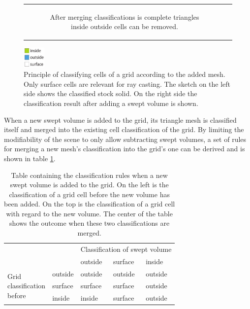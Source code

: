 \begin{figure}[!h]
\begin{tabular}{cc}
\begin{subfigure}[t]{0.3\textwidth}
			\caption{After merging classifications is complete triangles inside outside cells can be removed.}
			\label{fig:classification_after_removal}
		\end{subfigure}\\
	\end{tabular}
	\includegraphics[width=0.1\textwidth]{images/classification_legend}
	\caption{Principle of classifying cells of a grid according to the added mesh. Only surface cells are relevant for ray casting. The sketch on the left side shows the classified stock solid. On the right side the classification result after adding a swept volume is shown.}
	\label{fig:classification}
\end{figure}

When a new swept volume is added to the grid, its triangle mesh is classified itself and merged into the existing cell classification of the grid.
By limiting the modifiability of the scene to only allow subtracting swept volumes, a set of rules for merging a new mesh's classification into the grid's one can be derived and is shown in table \ref{tbl:classification_rules}.

\begin{table}[h]
	\centering
	\begin{tabular}{p{2cm}p{2cm}|p{2cm}p{2cm}p{2cm}}
		&         & \multicolumn{3}{l}{Classification of swept volume} \\
		&         & outside           & surface           & inside            \\ \hline
		\multirow{3}{*}{\parbox{2cm}{Grid \\ classification \\ before}} & outside & outside           & outside           & outside           \\
		& surface & surface           & surface           & outside           \\
		& inside  & inside            & surface           & outside          
	\end{tabular}
	\caption{
		Table containing the classification rules when a new swept volume is added to the grid.
		On the left is the classification of a grid cell before the new volume has been added.
		On the top is the classification of a grid cell with regard to the new volume.
		The center of the table shows the outcome when these two classifications are merged.
	}
	\label{tbl:classification_rules}
\end{table}

